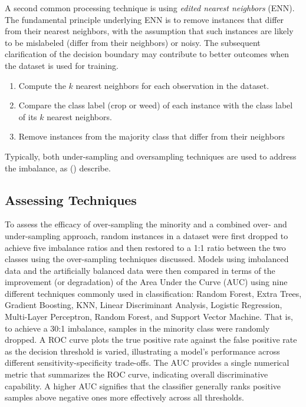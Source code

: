 \documentclass[letterpaper, notitlepage]{report}
\begin{document}
A second common processing technique is using \textit{edited nearest neighbors} (ENN). The fundamental principle underlying ENN is to remove instances that differ from their nearest neighbors, with the assumption that such instances are likely to be mislabeled (differ from their neighbors) or noisy. The subsequent clarification of the decision boundary may contribute to better outcomes when the dataset is used for training.
\begin{enumerate}
\item{Compute the $k$ nearest neighbors for each observation in the dataset.}
\item{Compare the class label (crop or weed) of each instance with the class label of its $k$ nearest neighbors.}
\item{Remove instances from the majority class that differ from their neighbors}
\end{enumerate}

Typically, both under-sampling and oversampling techniques are used to address the imbalance, as \citeauthor{Batista2004-qz} (\citeyear{Batista2004-qz}) describe. 

\subsection{Assessing Techniques}
To assess the efficacy of over-sampling the minority and a combined over- and under-sampling approach, random instances in a dataset were first dropped to achieve five imbalance ratios and then restored to a 1:1 ratio between the two classes using the over-sampling techniques discussed. Models using imbalanced data and the artificially balanced data were then compared in terms of the improvement (or degradation) of the Area Under the Curve (AUC) using nine different techniques commonly used in classification: Random Forest, Extra Trees, Gradient Boosting, KNN, Linear Discriminant Analysis, Logistic Regression, Multi-Layer Perceptron, Random Forest, and Support Vector Machine. That is, to achieve a 30:1 imbalance, samples in the minority class were randomly dropped. A \gls{ROC} curve plots the true positive rate against the false positive rate as the decision threshold is varied, illustrating a model’s performance across different sensitivity-specificity trade-offs. The \gls{AUC} provides a single numerical metric that summarizes the ROC curve, indicating overall discriminative capability. A higher AUC signifies that the classifier generally ranks positive samples above negative ones more effectively across all thresholds.
\end{document}
